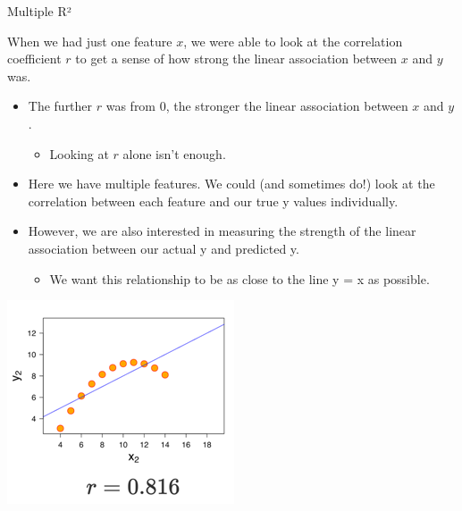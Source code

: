 \documentclass[aspectratio=169]{../latex_main/tntbeamer}  %
\begin{document}
	\begin{frame}{Multiple R²}
	
	    When we had just one feature $x$, we were able to look at the correlation coefficient $r$ to get a sense of how strong the linear association between $x$ and $y$ was. 
	    
	    \begin{itemize}
	        \item The further $r$ was from 0, the stronger the linear association between $x$ and $y$.
	        \begin{itemize}
	            \item Looking at $r$ alone isn’t enough. 
	        \end{itemize}
	        \item Here we have multiple features. We could (and sometimes do!) look at the correlation between each feature and our true y values individually.
	        \item However, we are also interested in measuring the strength of the linear association between our actual y and predicted y.
	        \begin{itemize}
	            \item We want this relationship to be as close to the line y = x as possible.
	        \end{itemize}
	    \end{itemize}
	    
	        \centering
	        \includegraphics[scale=.4]{Bild13}
	   
	\end{frame}
	
\end{document}
